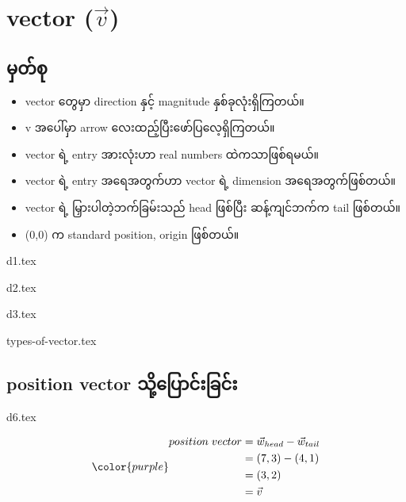 \section{vector ($\vec{v}$)}
\subsection{မှတ်စု}
{\begin{itemize}
        \item vector တွေမှာ direction နှင့် magnitude နှစ်ခုလုံးရှိကြတယ်။
        \item v အပေါ်မှာ arrow လေးထည့်ပြီးဖော်ပြလေ့ရှိကြတယ်။
        \item vector ရဲ့ entry အားလုံးဟာ real numbers ထဲကသာဖြစ်ရမယ်။
        \item vector ရဲ့ entry အရေအတွက်ဟာ vector ရဲ့ dimension အရေအတွက်ဖြစ်တယ်။
        \item vector ရဲ့ မြှားပါတဲ့ဘက်ခြမ်းသည် head ဖြစ်ပြီး ဆန့်ကျင်ဘက်က tail ဖြစ်တယ်။
        \item (0,0) က standard position, origin ဖြစ်တယ်။
    \end{itemize}}
\begin{minipage}{0.45\textwidth}
    \centering
    {d1.tex}
\end{minipage}
\hfill
\begin{minipage}{0.45\textwidth}
    \centering
    {d2.tex}
\end{minipage}
\clearpage
\begin{center}
    {d3.tex}
\end{center}
{types-of-vector.tex}
\subsection{position vector သို့ပြောင်းခြင်း}
\begin{center}
    {d6.tex}
\end{center}
\begin{equation}
    {\color{purple} \begin{split}
        position\hspace{1mm}vector & = \vec{w}_{head} - \vec{w}_{tail} \\
                        & = (7,3) - (4,1) \\
                        & = (3,2) \\
                        & = \vec{v}
    \end{split}}
    \label{eq:standard-position}
\end{equation}